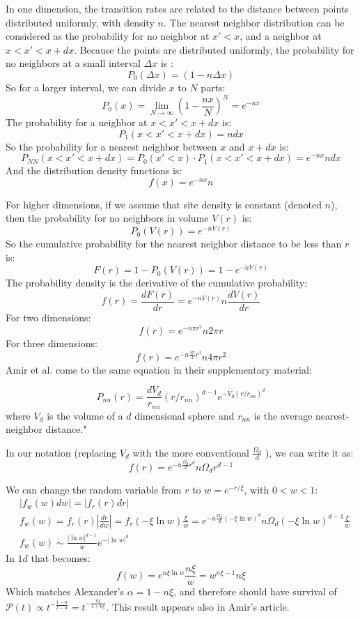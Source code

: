 \documentclass[onecolumn,fleqn]{revtex4}
\newenvironment{fminipage}%
  {\begin{Sbox}\begin{minipage}}%
  {\end{minipage}\end{Sbox}\fbox{\TheSbox}}
\begin{document}
In one dimension, the transition rates are related to the distance between points distributed uniformly, with density $n$. The nearest neighbor distribution can be considered as the probability for no neighbor at $x'<x$, and a neighbor at $x<x'<x+dx$. Because the points are distributed uniformly, the probability for no neighbors at a small interval $\Delta x$ is :
\[P_0(\Delta x) = (1-n\Delta x) \]
So for a larger interval, we can divide $x$ to $N$ parts:
\[P_0(x) = \lim_{N\rightarrow \infty}(1-\frac{nx}{N})^N = e^{-n x} \]
The probability for a neighbor at $x<x'<x+dx$ is:
\[P_1(x<x'<x+dx) = n dx \]
So the probability for a nearest neighbor between $x$ and $x+dx$ is:
\[P_{NN}(x< x'<x+dx) = P_0(x'<x)\cdot P_1(x<x'<x+dx) = e^{-n x}ndx \]
And the distribution density functions is:
\[ f(x) = e^{-n x}n\]

For higher dimensions, if we assume that site density is constant (denoted $n$), then the probability for no neighbors in volume $V(r)$ is:
\[ P_0( V(r)) = e^{-nV(r)}\]
So the cumulative probability for the nearest neighbor distance to be less than $r$ is:
\[ F (r) = 1-P_0(V(r)) = 1- e^{-nV(r)} \]
The probability density is the derivative of the cumulative probability:
\[ f(r) = \frac{dF(r)}{dr} =   e^{-nV(r)} n \frac{dV(r)}{dr} \]
For two dimensions:
\[ f(r) = e^{-n \pi r^2}n2\pi r \]
For three dimensions:
\[ f(r) = e^{-n \frac{4\pi}{3} r^3}n4\pi r^2 \]
Amir et al. \cite{Amir:2010:PRL} come to the same equation in their supplementary material:

\begin{fminipage}{\textwidth}
\[P_{nn}(r)=\frac{d
V_d}{r_{nn}} {(r/r_{nn})}^{d-1} e^{-V_d {(r/r_{nn})}^d}\] 
where $V_d$ is the volume of a $d$ dimensional sphere and $r_{nn}$ is the
average nearest-neighbor distance."
\end{fminipage}

In our notation (replacing $V_d$ with the more conventional $\frac{\Omega_d}{d}$ ), we can write it as:
\[ f(r) = e^{-n \frac{\Omega_d}{d} r^d} n\Omega_d r^{d-1} \]


We can change the random variable from $r$ to $w= e^{-r/ \xi}$, with $0<w<1$:
\begin{align*}
    &|f_w(w)dw| = |f_r(r)dr| \\
    &f_w(w) = f_r(r)\left|\frac{dr}{dw}\right| = f_r(-\xi \ln w)\frac{\xi}{w} = e^{-n \frac{\Omega_d}{d} (-\xi\ln w)^d} n\Omega_d (-\xi\ln w)^{d-1}\frac{\xi}{w} \\
    &f_w(w) \sim \frac{|\ln w|^{d-1}}{w} e^{-|\ln w|^d}
\end{align*}
In $1d$ that becomes:
\[ f(w)= e^{n \xi\ln w} \frac{n\xi}{w} = w^{n\xi-1}n\xi\]
Which matches Alexander's $\alpha = 1-n\xi$, and therefore should have survival of $\mathcal{P}(t)\propto t^{-\frac{1-\alpha}{2-\alpha}}= t^{-\frac{n\xi}{1+n\xi}}$. This result appears also in Amir's article.
\end{document}
